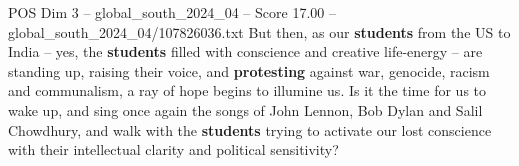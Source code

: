 \begin{textsample}{POS Dim 3 – global\_south\_2024\_04 – Score 17.00 – global\_south\_2024\_04/107826036.txt}
But then, as our \textbf{students} from the US to India -- yes, the \textbf{students} filled with conscience and creative life-energy -- are standing up, raising their voice, and \textbf{protesting} against war, genocide, racism and communalism, a ray of hope begins to illumine us.
Is it the time for us to wake up, and sing once again the songs of John Lennon, Bob Dylan and Salil Chowdhury, and walk with the \textbf{students} trying to activate our lost conscience with their intellectual clarity and political sensitivity?

\end{textsample}
